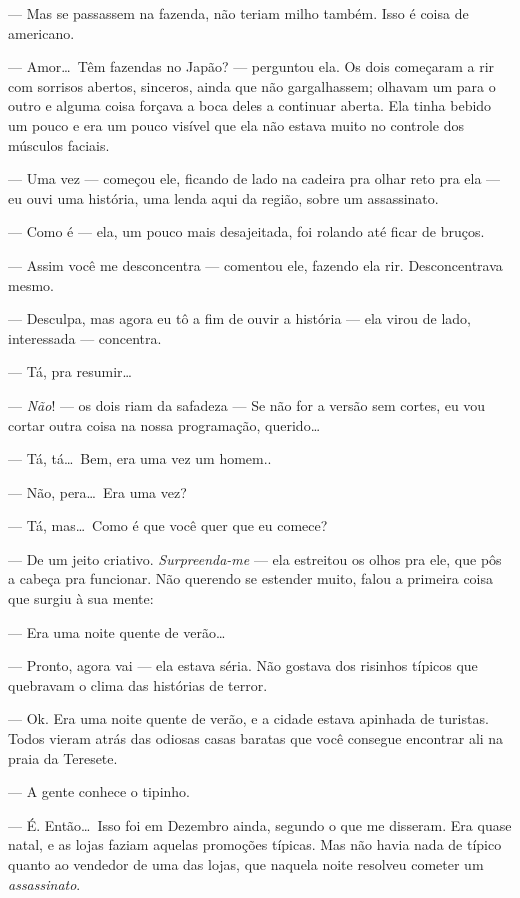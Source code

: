 --- Mas se passassem na fazenda, não teriam milho também. Isso é coisa de americano.

--- Amor\ldots \ Têm fazendas no Japão? --- perguntou ela. Os dois começaram a rir com sorrisos abertos, sinceros, ainda que não gargalhassem; olhavam um para o outro e alguma coisa forçava a boca deles a continuar aberta. Ela tinha bebido um pouco e era um pouco visível que ela não estava muito no controle dos músculos faciais.

--- Uma vez --- começou ele, ficando de lado na cadeira pra olhar reto pra ela --- eu ouvi uma história, uma lenda aqui da região, sobre um assassinato.

--- Como é --- ela, um pouco mais desajeitada, foi rolando até ficar de bruços.

--- Assim você me desconcentra --- comentou ele, fazendo ela rir. Desconcentrava mesmo.

--- Desculpa, mas agora eu tô a fim de ouvir a história --- ela virou de lado, interessada --- concentra.

--- Tá, pra resumir\ldots

--- \emph{Não}! --- os dois riam da safadeza --- Se não for a versão sem cortes, eu vou cortar outra coisa na nossa programação, querido\ldots

--- Tá, tá\ldots \ Bem, era uma vez um homem..

--- Não, pera\ldots \ Era uma vez?

--- Tá, mas\ldots \ Como é que você quer que eu comece?

--- De um jeito criativo. \emph{Surpreenda-me} --- ela estreitou os olhos pra ele, que pôs a cabeça pra funcionar. Não querendo se estender muito, falou a primeira coisa que surgiu à sua mente:

--- Era uma noite quente de verão\ldots 

--- Pronto, agora vai --- ela estava séria. Não gostava dos risinhos típicos que quebravam o clima das histórias de terror.

--- Ok. Era uma noite quente de verão, e a cidade estava apinhada de turistas. Todos vieram atrás das odiosas casas baratas que você consegue encontrar ali na praia da Teresete.

--- A gente conhece o tipinho.

--- É. Então\ldots \ Isso foi em Dezembro ainda, segundo o que me disseram. Era quase natal, e as lojas faziam aquelas promoções típicas. Mas não havia nada de típico quanto ao vendedor de uma das lojas, que naquela noite resolveu cometer um \emph{assassinato}.

